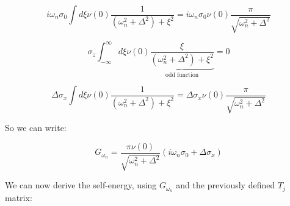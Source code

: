 \[ i \omega_n \sigma_0 \int d\xi \nu(0) \frac{1}{(\omega_n^2 + \Delta^2)+\xi^2} = i\omega_n \sigma_0 \nu(0) \frac{\pi}{\sqrt{\omega_n^2 + \Delta^2}} \]

\[ \sigma_z \int_{-\infty}^{\infty} d\xi \nu(0) \underbrace{\frac{\xi}{(\omega_n^2 + \Delta^2)+\xi^2}}_{\textrm{odd function}} = 0\]

\[ \Delta \sigma_x \int d\xi \nu(0) \frac{1}{(\omega_n^2 + \Delta^2)+\xi^2} = \Delta \sigma_x \nu(0) \frac{\pi}{\sqrt{\omega_n^2 + \Delta^2}} \]

So we can write:

\[ G_{\omega_n} = \frac{\pi \nu(0)}{\sqrt{\omega_n^2 + \Delta^2}}(i\omega_n \sigma_0 + \Delta \sigma_x)\]

We can now derive the self-energy, using \(G_{\omega_n}\) and the
previously defined \(T_j\) matrix:

